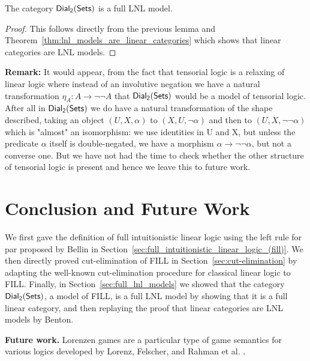 \begin{corollary}
  \label{corollary:dial-FLNL}
  The category $\mathsf{Dial_2}(\mathsf{Sets})$ is a full LNL model.
\end{corollary}
\begin{proof}
  This follows directly from the previous lemma and
  Theorem~\ref{thm:lnl_models_are_linear_categories} which shows that
  linear categories are LNL models.
\end{proof}

\textbf{Remark:} It would appear, from the fact that tensorial logic
\cite{Mellies:2008} is a relaxing of linear logic where instead of an
involutive negation we have a natural transformation $\eta_A\colon A
\to \neg\neg A$ that $\mathsf{Dial_2}(\mathsf{Sets})$ would be a model of tensorial
logic. After all in $\mathsf{Dial_2}(\mathsf{Sets})$ we do have a natural transformation of the
shape described, taking an object $(U,X, \alpha)$ to $(X, U, \neg
\alpha)$ and then to $(U, X, \neg\neg \alpha)$ which is "almost" an
isomorphism: we use identities in U and X, but unless the predicate
$\alpha$ itself is double-negated, we have a morphism $\alpha \to
\neg\neg \alpha$, but not a converse one. But we have not had the time
to check whether the other structure of tensorial logic is present and
hence we leave this to future work.

\section{Conclusion and Future Work}
\label{sec:conclusion_and_future_work}

We first gave the definition of full intuitionistic linear logic using
the left rule for par proposed by Bellin in
Section~\ref{sec:full_intuitionistic_linear_logic_(fill)}.  We then
directly proved cut-elimination of FILL in
Section~\ref{sec:cut-elimination} by adapting the well-known
cut-elimination procedure for classical linear logic to FILL.
Finally, in Section~\ref{sec:full_lnl_models} we showed that the
category $\mathsf{Dial_2}(\mathsf{Sets})$, a model of FILL, is a full LNL model by showing that
it is a full linear category, and then replaying the proof that linear
categories are LNL models by Benton.

\textbf{Future work.} Lorenzen games are a particular type of game
semantics for various logics developed by Lorenz, Felscher, and Rahman
et al. \cite{Keiff:2011,Rahman:2005}. %

